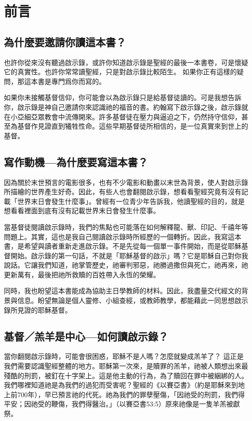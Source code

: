 \chapter*{前言}


\section*{為什麼要邀請你讀這本書？}
\normalsize
也許你從來沒有聽過啟示錄，或許你知道啟示錄是聖經的最後一本書卷，可是懷疑它的真實性。也許你常常讀聖經，只是對啟示錄比較陌生。
如果你正有這樣的疑問，那這本書是專門爲你而寫的。

如果你未接觸基督信仰，你可能會以為啟示錄只是給基督徒讀的。可是我想告訴你，啟示錄是神自己邀請你來認識祂的福音的書。約翰寫下啟示錄之後，啟示錄就在小亞細亞眾教會中流傳開來。許多基督徒在壓力與逼迫之下，仍然持守信仰，甚至為基督作見證直到犧牲性命。這些早期基督徒所相信的，是一位真實來到世上的基督。

\section*{寫作動機—為什麼要寫這本書？}

因為關於末世預言的電影很多，也有不少電影和動畫以末世為背景，使人對啟示錄所描繪的世界產生好奇。因此，有些人也會翻閱啟示錄，想看看聖經究竟有沒有記載「世界末日會發生什麼事」。曾經有一位青少年告訴我，他讀聖經的目的，就是想看看裡面到底有沒有記載世界末日會發生什麼事。
 
當基督徒閱讀啟示錄時，我們的焦點也可能落在如何解釋龍、獸、印記、千禧年等問題上。其實，這也是我自己閱讀啟示錄時所經歷的一個轉折。因此，我寫這本書，是希望與讀者重新走進啟示錄。不是先從每一個單一事件開始，而是從耶穌基督開始。啟示錄的第一句話，不就是「耶穌基督的啟示」嗎？它是耶穌自己對你我說話。它讓我們知道，祂掌管歷史，祂審判邪惡，祂勝過撒但與死亡，祂再來，祂更新萬有，最後把祂所救贖的百姓帶入永恆的榮耀。

同時，我也盼望這本書能成為協助主日學教師的材料。因此，我盡量交代經文的背景與信息。盼望無論是個人靈修、小組查經，或教師教學，都能藉此一同思想啟示錄所見證的耶穌基督。

\section*{基督／羔羊是中心—如何讀啟示錄？}

當你翻閱啟示錄時，可能會很困惑，耶穌不是人嗎？怎麼就變成羔羊了？
這正是我們需要認識聖經整體的地方。耶穌第一次來，是贖罪的羔羊，祂被人類想出來最殘酷的刑罰，被釘在十字架上。這是他主動的行為，為了贖回在罪中被綑綁的人。我們哪裡知道祂是為我們的過犯而受害呢？聖經的《以賽亞書》（約是耶穌來到地上前700年），早已預言祂的代死。祂為我們的罪孽壓傷，「因祂受的刑罰，我們得平安；因祂受的鞭傷，我們得醫治。」（以賽亞書53:5）原來祂像是一隻羊羔被獻祭。

